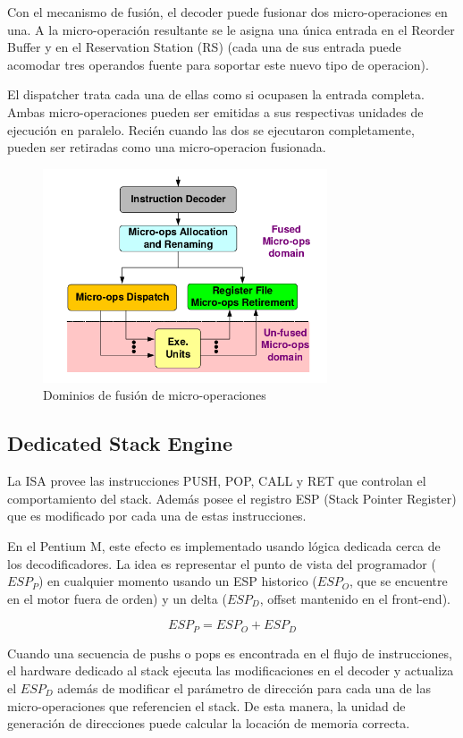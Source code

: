 Con el mecanismo de fusión, el decoder puede fusionar dos micro-operaciones en una. A la micro-operación resultante se le asigna una única entrada en el Reorder Buffer y en el Reservation Station (RS) (cada una de sus entrada puede acomodar tres operandos fuente para soportar este nuevo tipo de operacion). 

El dispatcher trata cada una de ellas como si ocupasen la entrada completa. Ambas micro-operaciones pueden ser emitidas a sus respectivas unidades de ejecución en paralelo. Recién cuando las dos se ejecutaron completamente, pueden ser retiradas como una micro-operacion fusionada.

\begin{figure}[ht]
	\centering
	\includegraphics[width=0.75\textwidth]{imagenes/micro-op-fusion}
	\caption{Dominios de fusión de micro-operaciones}
	\label{fig:MicroOpFusion}
\end{figure}

\subsection{Dedicated Stack Engine}
La ISA provee las instrucciones PUSH, POP, CALL y RET que controlan el comportamiento del stack. Además posee el registro ESP (Stack Pointer Register) que es modificado por cada una de estas instrucciones.

En el Pentium M, este efecto es implementado usando lógica dedicada cerca de los decodificadores. La idea es representar el punto de vista del programador ($ESP_P$) en cualquier momento usando un ESP historico ($ESP_O$, que se encuentre en el motor fuera de orden) y un delta ($ESP_D$, offset mantenido en el front-end).

$$ESP_P = ESP_O + ESP_D$$

Cuando una secuencia de pushs o pops es encontrada en el flujo de instrucciones, el hardware dedicado al stack ejecuta las modificaciones en el decoder y actualiza el $ESP_D$ además de modificar el parámetro de dirección para cada una de las micro-operaciones que referencien el stack. De esta manera, la unidad de generación de direcciones puede calcular la locación de memoria correcta.

